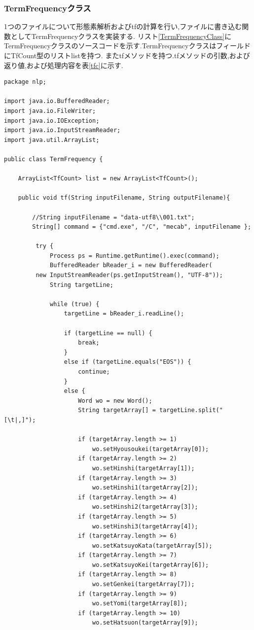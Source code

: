 \documentclass[a4j]{jarticle}
\begin{document}
    \subsubsection{TermFrequencyクラス}
    1つのファイルについて形態素解析およびtfの計算を行い,ファイルに書き込む関数としてTermFrequencyクラスを実装する.
    リスト\ref{TermFrequencyClass}にTermFrequencyクラスのソースコードを示す.TermFrequencyクラスはフィールドにTfCount型のリストlistを持つ.
    またtfメソッドを持つ.tfメソッドの引数,および返り値,および処理内容を表\ref{tfc}に示す.
    \begin{lstlisting}[basicstyle=\ttfamily\footnotesize, frame=single,label=TermFrequencyClass,caption=TermFrequencyクラスのソースコード]
package nlp;

import java.io.BufferedReader;
import java.io.FileWriter;
import java.io.IOException;
import java.io.InputStreamReader;
import java.util.ArrayList;

public class TermFrequency {

	ArrayList<TfCount> list = new ArrayList<TfCount>();

	public void tf(String inputFilename, String outputFilename){

		//String inputFilename = "data-utf8\\001.txt";
		String[] command = {"cmd.exe", "/C", "mecab", inputFilename };

		 try {
			 Process ps = Runtime.getRuntime().exec(command);
			 BufferedReader bReader_i = new BufferedReader(
         new InputStreamReader(ps.getInputStream(), "UTF-8"));
			 String targetLine;

			 while (true) {
				 targetLine = bReader_i.readLine();

				 if (targetLine == null) {
					 break;
				 }
				 else if (targetLine.equals("EOS")) {
					 continue;
				 }
				 else {
					 Word wo = new Word();
					 String targetArray[] = targetLine.split("[\t|,]");

					 if (targetArray.length >= 1)
						 wo.setHyousoukei(targetArray[0]);
					 if (targetArray.length >= 2)
						 wo.setHinshi(targetArray[1]);
					 if (targetArray.length >= 3)
						 wo.setHinshi1(targetArray[2]);
					 if (targetArray.length >= 4)
						 wo.setHinshi2(targetArray[3]);
					 if (targetArray.length >= 5)
						 wo.setHinshi3(targetArray[4]);
					 if (targetArray.length >= 6)
						 wo.setKatsuyoKata(targetArray[5]);
					 if (targetArray.length >= 7)
						 wo.setKatsuyoKei(targetArray[6]);
					 if (targetArray.length >= 8)
						 wo.setGenkei(targetArray[7]);
					 if (targetArray.length >= 9)
						 wo.setYomi(targetArray[8]);
					 if (targetArray.length >= 10)
						 wo.setHatsuon(targetArray[9]);


\end{lstlisting}
\end{document}
